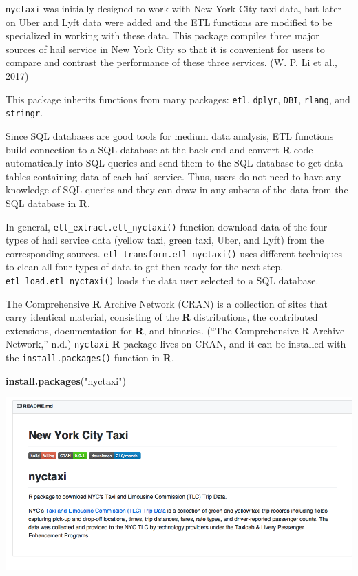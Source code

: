 \documentclass[12pt,twoside]{reedthesis}
\newenvironment{Shaded}{\begin{snugshade}}{\end{snugshade}}
\newcommand{\KeywordTok}[1]{\textcolor[rgb]{0.13,0.29,0.53}{\textbf{#1}}}
\newcommand{\StringTok}[1]{\textcolor[rgb]{0.31,0.60,0.02}{#1}}
\newcommand{\NormalTok}[1]{#1}
\theoremstyle{definition}
\theoremstyle{definition}
\theoremstyle{definition}
\theoremstyle{remark}
\begin{document}
\texttt{nyctaxi} was initially designed to work with New York City taxi
data, but later on Uber and Lyft data were added and the ETL functions
are modified to be specialized in working with these data. This package
compiles three major sources of hail service in New York City so that it
is convenient for users to compare and contrast the performance of these
three services. (W. P. Li et al., 2017)

This package inherits functions from many packages: \texttt{etl},
\texttt{dplyr}, \texttt{DBI}, \texttt{rlang}, and \texttt{stringr}.

Since SQL databases are good tools for medium data analysis, ETL
functions build connection to a SQL database at the back end and convert
\textbf{R} code automatically into SQL queries and send them to the SQL
database to get data tables containing data of each hail service. Thus,
users do not need to have any knowledge of SQL queries and they can draw
in any subsets of the data from the SQL database in \textbf{R}.

In general, \texttt{etl\_extract.etl\_nyctaxi()} function download data
of the four types of hail service data (yellow taxi, green taxi, Uber,
and Lyft) from the corresponding sources.
\texttt{etl\_transform.etl\_nyctaxi()} uses different techniques to
clean all four types of data to get then ready for the next step.
\texttt{etl\_load.etl\_nyctaxi()} loads the data user selected to a SQL
database.

The Comprehensive \textbf{R} Archive Network (CRAN) is a collection of
sites that carry identical material, consisting of the \textbf{R}
distributions, the contributed extensions, documentation for \textbf{R},
and binaries. (``The Comprehensive R Archive Network,'' n.d.)
\texttt{nyctaxi} \textbf{R} package lives on CRAN, and it can be
installed with the \texttt{install.packages()} function in \textbf{R}.
\begin{Shaded}
\begin{Highlighting}[]
\KeywordTok{install.packages}\NormalTok{(}\StringTok{"nyctaxi"}\NormalTok{)}
\end{Highlighting}
\end{Shaded}
\begin{center}\includegraphics[width=5.88in]{figure/nyctaxi-page} \end{center}
\end{document}
